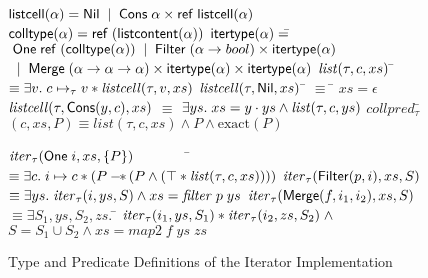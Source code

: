 \begin{figure}
\mbox{}
\begin{specification}
$\mathsf{listcell}(\alpha) = \mathsf{Nil} \;\;|\;\; \mathsf{Cons}\; \alpha \times \mathsf{ref}\;\mathsf{listcell}(\alpha)$ 
\nextline
$\mathsf{colltype}(\alpha) = \mathsf{ref}\;(\mathsf{listcontent}(\alpha))$ 
$\mathsf{itertype}{(\alpha)} =$\=$\;\mathsf{One}\;\mathsf{ref}\;(\mathsf{colltype}{(\alpha)}) \;\;|\;\; 
                          \mathsf{Filter}\;(\alpha \to bool) \times \mathsf{itertype}{(\alpha)}$
\nextline
                       \>$\;\;|\;\; \mathsf{Merge}\; (\alpha \to \alpha \to \alpha) \times \mathsf{itertype}(\alpha) \times \mathsf{itertype}(\alpha)$
$\mathit{list}(\tau, c, xs)$ \qquad\= $\equiv \exists v.\; c \mapsto_\tau v * \mathit{listcell}(\tau, v, xs)$ 
\nextline
$\mathit{listcell}(\tau, \mathsf{Nil}, xs)$ \qquad\qquad\= $\equiv$ \= $xs = \epsilon$ 
\nextline
$\mathit{listcell}(\tau, \mathsf{Cons}(y,c), xs)$ \> $\equiv$ \> 
   $\exists ys.\; xs = y\cdot ys \land \mathit{list}(\tau, c, ys)$ 
$collpred_\tau$\=$(c, xs, P) \equiv list(\tau, c, xs) \land P \land \mbox{exact}(P)$ 

$\mathit{iter}_\tau(\mathsf{One}\;i, xs, \{{P}\}) \qquad\qquad$\=$\equiv \exists c.\; i \mapsto c * (P -\!\!*\, (P \land (\top * \mathit{list}(\tau, c, xs))))$ 
\nextline
$\mathit{iter}_\tau(\mathsf{Filter}(p, i), xs, S)$ \>$\equiv 
  \exists ys.\; \mathit{iter}_\tau(i, ys, S) \land xs = \mathit{filter}\;p\;ys$ 
\nextline
$\mathit{iter}_{\tau}(\mathsf{Merge}(f, i_1, i_2), xs, S)$ \>$\equiv 
  \exists S_1, ys, S_2, zs.$ 
\nextline
  \> \qquad \= $\mathit{iter}_\tau(i_1, ys, S_1) * \mathit{iter}_\tau(i_2, zs, S_2) \;\land$
\nextline \> \>$S = S_1 \cup S_2 \land xs = \mathit{map2}\;f\;ys\;zs$ 
\end{specification}
\caption{Type and Predicate Definitions of the Iterator Implementation}
\label{iterator-pred-impl}
\end{figure}

